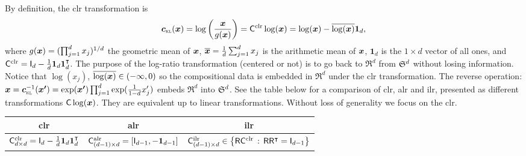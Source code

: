 \documentclass{article}
\begin{document}
By definition, the clr transformation is
\begin{equation}\label{eq:clr}
\clrlog(\ve{x})
= \log\left(\frac{\ve{x}}{g(\ve{x})}\right)
= \C^{\mathrm{clr}} \log(\ve{x})
= \log(\ve{x})-\overline{\log(\ve{x})}\bm{1}_d,
\end{equation}
where $g(\bm{x})=(\prod_{j=1}^d x_j)^{1/d}$ the geometric mean of $\bm{x}$,
$\overline{\bm{x}}=\frac{1}{d}\sum_{j=1}^d x_j$ is the arithmetic mean of $\bm{x}$,
$\bm{1}_d$ is the $1\times{d}$ vector of all ones,
and $\mathsf{C}^{\mathrm{clr}}=\mathsf{I}_{d}-\frac{1}{d}\bm{1}_d\bm{1}_d^\intercal$.
The purpose of the log-ratio transformation (centered or not) is to go back to $\Re^d$ from $\mathfrak{S}^{d}$ without losing information.
Notice that $\log(x_{j})$, $\overline{\log(\bm{x})}\in(-\infty,0)$ so the compositional data is embedded in $\Re^d$ under the clr transformation.
The reverse operation:
$\ve{x}=\clrlog^{-1}(\ve{x'})=\exp(\ve{x'})\prod_{j=1}^d \exp(\frac{1}{1-d}x'_{j})$ embeds $\Re^d$ into $\mathfrak{S}^{d}$.
See the table below for a comparison of clr, alr and ilr, presented
as different transformations $\mathsf{C}\log(\bm{x})$.
They are equivalent up to linear transformations.
Without loss of generality we focus on the clr.

\begin{center}
  \begin{tabular}{c||c||c}
  \toprule
  clr & alr & ilr \\
  \hline
  $\mathsf{C}^{\mathrm{clr}}_{d\times{d}}=\mathsf{I}_{d}-\frac{1}{d}\bm{1}_d\bm{1}_d^\intercal$
  & $\mathsf{C}^{\mathrm{alr}}_{(d-1)\times{d}}=\left[\mathsf{I}_{d-1},-\bm{1}_{d-1}\right]$
  & $\mathsf{C}^{\mathrm{ilr}}_{(d-1)\times{d}}\in\left\{\mathsf{R}\mathsf{C}^{\mathrm{clr}}\,:\,\mathsf{R}\mathsf{R}^\intercal=\mathsf{I}_{d-1}\right\}$ \\
  \bottomrule
  \end{tabular}
\end{center}


\end{document}
